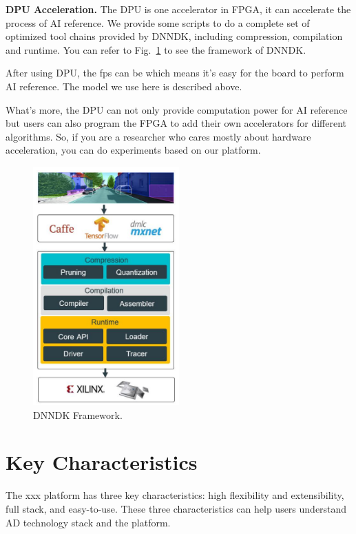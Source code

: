 \documentclass[conference]{IEEEtran}
\begin{document}
\begin{sloppypar}
\begin{itemize}
\end{itemize}

\textbf{DPU Acceleration. }The DPU\cite{b17} is one accelerator in FPGA, it can accelerate the process of AI reference. We provide some scripts to do a complete set of optimized tool chains provided by DNNDK, including compression, compilation and runtime. You can refer to Fig.~\ref{df} to see the framework of DNNDK. 

After using DPU, the fps can be which means it's easy for the board to perform AI reference. The model we use here is described above. 

What's more, the DPU can not only provide computation power for AI reference but users can also program the FPGA to add their own accelerators for different algorithms. So, if you are a researcher who cares mostly about hardware acceleration, you can do experiments based on our platform.

\begin{figure}[htbp]
\centerline{\includegraphics[width=0.5\textwidth,height=0.5\textheight]{DNNDK.PNG}}
\caption{DNNDK Framework\cite{b17}.}
\label{df}
\end{figure}

\section{Key Characteristics}
The xxx platform has three key characteristics: high flexibility and extensibility, full stack, and easy-to-use. These three characteristics can help users understand AD technology stack and the platform.


\end{sloppypar}
\end{document}
